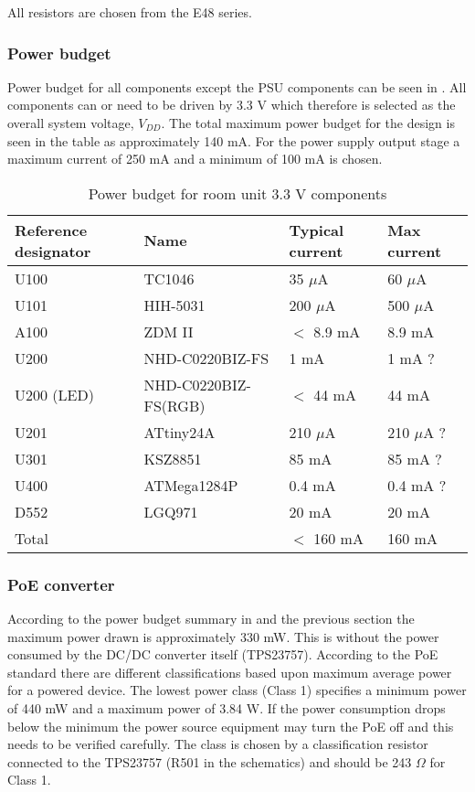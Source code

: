 All resistors are chosen from the E48 series.

\subsubsection{Power budget}
Power budget for all components except the PSU components can be seen
in . All components can or need to be
driven by 3.3 V which therefore is selected as the overall system
voltage, $V_{DD}$. The total maximum power budget for the design is
seen in the table as approximately 140 mA. For the power supply output
stage a maximum current of 250 mA and a minimum of 100 mA is chosen.

\begin{table}
\begin{tabular}{|l|l|l|l|}
\hline
Reference designator & Name        & Typical current & Max current\\
\hline
U100                 & TC1046      & 35 $\mu$A        & 60 $\mu$A\\
U101                 & HIH-5031    & 200 $\mu$A       & 500 $\mu$A\\
A100                 & ZDM II      & $<$ 8.9 mA          & 8.9 mA\\
U200                 & NHD-C0220BIZ-FS & 1 mA         & 1 mA ? \\
U200 (LED)           & NHD-C0220BIZ-FS(RGB) & $<$ 44 mA  & 44 mA \\
U201                 & ATtiny24A   & 210 $\mu$A       & 210 $\mu$A ? \\
U301                 & KSZ8851     & 85 mA            & 85 mA ? \\
U400                 & ATMega1284P & 0.4 mA           & 0.4 mA ? \\
D552                 & LGQ971      & 20 mA            & 20 mA \\
\hline
Total                &             & $<$ 160 mA            & 160 mA \\
\hline
\end{tabular}
\caption{Power budget for room unit 3.3 V components}
\label{tab:powerbudget_roomunit}
\end{table}


\subsubsection{PoE converter}
According to the power budget summary
in  and the previous section the
maximum power drawn is approximately 330 mW. This is without the power
consumed by the DC/DC converter itself (TPS23757). According to the
PoE standard there are different classifications based upon maximum
average power for a powered device. The lowest power class (Class 1)
specifies a minimum power of 440 mW and a maximum power of 3.84 W. If
the power consumption drops below the minimum the power source
equipment may turn the PoE off and this needs to be verified
carefully. The class is chosen by a classification resistor connected
to the TPS23757 (R501 in the schematics) and should be 243 $\Omega$
for Class 1.

